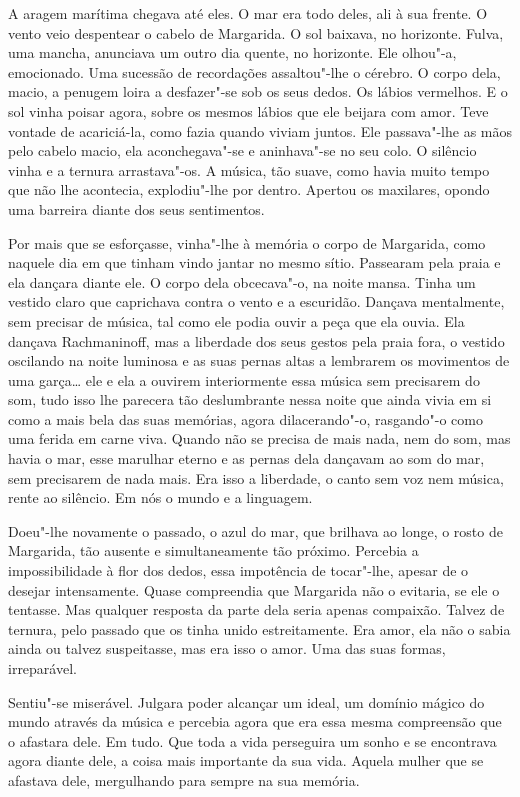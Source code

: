 A aragem marítima chegava até eles. O mar era todo deles, ali à sua
frente. O vento veio despentear o cabelo de Margarida. O sol baixava, no
horizonte. Fulva, uma mancha, anunciava um outro dia quente, no
horizonte. Ele olhou"-a, emocionado. Uma sucessão de recordações
assaltou"-lhe o cérebro. O corpo dela, macio, a penugem loira a
desfazer"-se sob os seus dedos. Os lábios vermelhos. E o sol vinha poisar
agora, sobre os mesmos lábios que ele beijara com amor. Teve vontade de
acariciá-la, como fazia quando viviam juntos. Ele passava"-lhe as mãos
pelo cabelo macio, ela aconchegava"-se e aninhava"-se no seu colo. O
silêncio vinha e a ternura arrastava"-os. A música, tão suave, como havia
muito tempo que não lhe acontecia, explodiu"-lhe por dentro. Apertou os
maxilares, opondo uma barreira diante dos seus sentimentos.

Por mais que se esforçasse, vinha"-lhe à memória o corpo de Margarida,
como naquele dia em que tinham vindo jantar no mesmo sítio. Passearam
pela praia e ela dançara diante ele. O corpo dela obcecava"-o, na noite
mansa. Tinha um vestido claro que caprichava contra o vento e a
escuridão. Dançava mentalmente, sem precisar de música, tal como ele
podia ouvir a peça que ela ouvia. Ela dançava Rachmaninoff, mas a
liberdade dos seus gestos pela praia fora, o vestido oscilando na noite
luminosa e as suas pernas altas a lembrarem os movimentos de uma
garça\ldots{} ele e ela a ouvirem interiormente essa música sem
precisarem do som, tudo isso lhe parecera tão deslumbrante nessa noite
que ainda vivia em si como a mais bela das suas memórias, agora
dilacerando"-o, rasgando"-o como uma ferida em carne viva. Quando não se
precisa de mais nada, nem do som, mas havia o mar, esse marulhar eterno
e as pernas dela dançavam ao som do mar, sem precisarem de nada mais.
Era isso a liberdade, o canto sem voz nem música, rente ao silêncio. Em
nós o mundo e a linguagem.

Doeu"-lhe novamente o passado, o azul do mar, que brilhava ao longe, o
rosto de Margarida, tão ausente e simultaneamente tão próximo. Percebia
a impossibilidade à flor dos dedos, essa impotência de tocar"-lhe, apesar
de o desejar intensamente. Quase compreendia que Margarida não o
evitaria, se ele o tentasse. Mas qualquer resposta da parte dela seria
apenas compaixão. Talvez de ternura, pelo passado que os tinha unido
estreitamente. Era amor, ela não o sabia ainda ou talvez suspeitasse,
mas era isso o amor. Uma das suas formas, irreparável.

Sentiu"-se miserável. Julgara poder alcançar um ideal, um domínio mágico
do mundo através da música e percebia agora que era essa mesma
compreensão que o afastara dele. Em tudo. Que toda a vida perseguira um
sonho e se encontrava agora diante dele, a coisa mais importante da sua
vida. Aquela mulher que se afastava dele, mergulhando para sempre na sua
memória.

